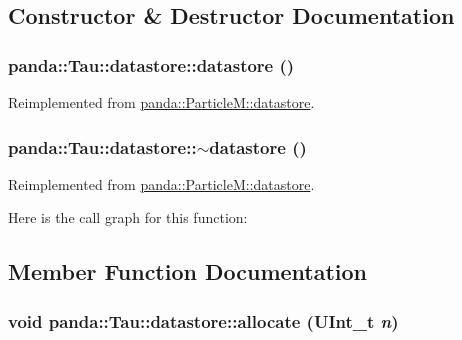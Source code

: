 \subsection{Constructor \& Destructor Documentation}
\hypertarget{structpanda_1_1Tau_1_1datastore_a48102b990097fe44c912c4a155786846}{
\subsubsection[{datastore}]{\setlength{\rightskip}{0pt plus 5cm}panda::Tau::datastore::datastore ()}}
\label{structpanda_1_1Tau_1_1datastore_a48102b990097fe44c912c4a155786846}


Reimplemented from \hyperlink{structpanda_1_1ParticleM_1_1datastore_acc9af307e2c4fee9bc5d9bbb37ad6124}{panda::ParticleM::datastore}.\hypertarget{structpanda_1_1Tau_1_1datastore_a1cacb9f88f221d242a5e80ba7959c27b}{
\subsubsection[{$\sim$datastore}]{\setlength{\rightskip}{0pt plus 5cm}panda::Tau::datastore::$\sim$datastore ()}}
\label{structpanda_1_1Tau_1_1datastore_a1cacb9f88f221d242a5e80ba7959c27b}


Reimplemented from \hyperlink{structpanda_1_1ParticleM_1_1datastore_ae068980c20730bc8565d2f7ea701bc5e}{panda::ParticleM::datastore}.

Here is the call graph for this function:

\subsection{Member Function Documentation}
\hypertarget{structpanda_1_1Tau_1_1datastore_a6f817076ea4ed71fc8b66c70a834b39d}{
\subsubsection[{allocate}]{\setlength{\rightskip}{0pt plus 5cm}void panda::Tau::datastore::allocate (UInt\_\-t {\em n})}}
\label{structpanda_1_1Tau_1_1datastore_a6f817076ea4ed71fc8b66c70a834b39d}


